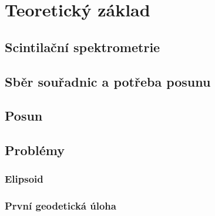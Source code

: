 \chapter{Teoretický základ}
\label{2-teorie}



\section{Scintilační spektrometrie}
\label{spektrometrie}



\section{Sběr souřadnic a potřeba posunu}
\label{potreba posunu}




\section{Posun}
\label{posun}


\section{Problémy}
\label{problemy}

\subsection{Elipsoid}
\label{elipsoid}


\subsection{První geodetická úloha}
\label{prvnigu}


